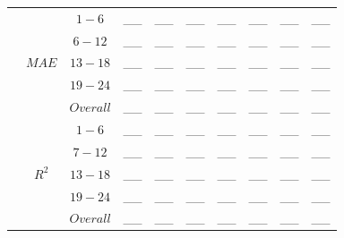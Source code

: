 \begin{table}[h]
\begin{center}
\begin{tabular}{@{}p{5.3em}ccccccccc@{}}
                                              & \multirow{5}{*}{$MAE$} & $1 - 6$ & \_\_ & \_\_ & \_\_ & \_\_ & \_\_ & \_\_ & \_\_ \\
                                              &                   & $6 - 12$ & \_\_ & \_\_ & \_\_ & \_\_ & \_\_ & \_\_ & \_\_ \\
                                              &                   & $13 - 18$ & \_\_ & \_\_ & \_\_ & \_\_ & \_\_ & \_\_ & \_\_ \\
                                              &                   & $19 - 24$ & \_\_ & \_\_ & \_\_ & \_\_ & \_\_ & \_\_ & \_\_ \\
                                              &                   & $Overall$ & \_\_ & \_\_ & \_\_ & \_\_ & \_\_ & \_\_ & \_\_ \\ \cmidrule(lr){2-10}
                                              & \multirow{5}{*}{$R^2$} & $1 - 6$ & \_\_ & \_\_ & \_\_ & \_\_ & \_\_ & \_\_ & \_\_ \\
                                              &                   & $7 - 12$ & \_\_ & \_\_ & \_\_ & \_\_ & \_\_ & \_\_ & \_\_ \\
                                              &                   & $13 - 18$ & \_\_ & \_\_ & \_\_ & \_\_ & \_\_ & \_\_ & \_\_ \\
                                              &                   & $19 - 24$ & \_\_ & \_\_ & \_\_ & \_\_ & \_\_ & \_\_ & \_\_ \\
                                              &                   & $Overall$ & \_\_ & \_\_ & \_\_ & \_\_ & \_\_ & \_\_ & \_\_ \\ 
    \bottomrule
    \end{tabular}
\end{center}
\end{table}

